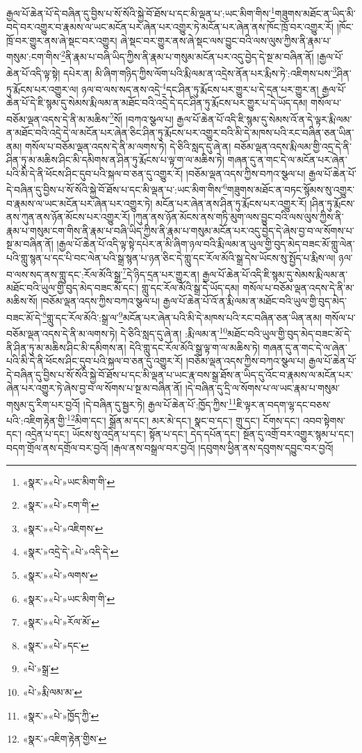 རྒྱལ་པོ་ཆེན་པོ་དེ་བཞིན་དུ་བྱིས་པ་སོ་སོའི་སྐྱེ་བོ་ཐོས་པ་དང་མི་ལྡན་པ་:ཡང་མིག་གིས་\footnote{«སྣར་»«པེ་»ཡང་མིག་གི་}གཟུགས་མཐོང་ན་ཡིད་མི་བདེ་བར་འགྱུར་བ་རྣམས་ལ་ཡང་མངོན་པར་ཞེན་པར་འགྱུར་ཏེ་མངོན་པར་ཞེན་ནས་ཁོང་ཁྲོ་བར་འགྱུར་རོ། །ཁོང་ཁྲོ་བར་གྱུར་ནས་ཞེ་སྡང་བར་འགྱུར། ཞེ་སྡང་བར་གྱུར་ནས་ཞེ་སྡང་ལས་བྱུང་བའི་ལས་ལུས་ཀྱིས་ནི་རྣམ་པ་གསུམ་:ངག་གིས་\footnote{«སྣར་»«པེ་»ངག་གི་}ནི་རྣམ་པ་བཞི་ཡིད་ཀྱིས་ནི་རྣམ་པ་གསུམ་མངོན་པར་འདུ་བྱེད་དེ་སྔ་མ་བཞིན་ནོ། །རྒྱལ་པོ་ཆེན་པོ་འདི་ལྟ་སྟེ། དཔེར་ན། མི་ཞིག་གཉིད་ཀྱིས་ལོག་པའི་རྨི་ལམ་ན་འདྲེས་ནོན་པར་རྨིས་ཏེ་:འཇིགས་པས་\footnote{«སྣར་»«པེ་»འཇིགས་}ཤིན་ཏུ་རྨོངས་པར་འགྱུར་ལ། ཉལ་བ་ལས་སད་ནས་འདྲེ་\footnote{«སྣར་»འདྲེ་དེ་«པེ་»འདི་དེ་}དང་ཤིན་ཏུ་རྨོངས་པར་གྱུར་པ་དེ་དྲན་པར་གྱུར་ན། རྒྱལ་པོ་ཆེན་པོ་དེ་ཇི་སྙམ་དུ་སེམས་རྨི་ལམ་ན་མཐོང་བའི་འདྲེ་དེ་དང་ཤིན་ཏུ་རྨོངས་པར་གྱུར་པ་དེ་ཡོད་དམ། གསོལ་པ་བཅོམ་ལྡན་འདས་དེ་ནི་མ་མཆིས་\footnote{«སྣར་»«པེ་»ལགས་}སོ། །བཀའ་སྩལ་པ། རྒྱལ་པོ་ཆེན་པོ་འདི་ཇི་སྙམ་དུ་སེམས་འོ་ན་དེ་ལྟར་རྨི་ལམ་ན་མཐོང་བའི་འདྲེ་དེ་ལ་མངོན་པར་ཞེན་ཅིང་ཤིན་ཏུ་རྨོངས་པར་འགྱུར་བའི་མི་དེ་མཁས་པའི་རང་བཞིན་ཅན་ཡིན་ནམ། གསོལ་པ་བཅོམ་ལྡན་འདས་དེ་ནི་མ་ལགས་ཏེ། དེ་ཅིའི་སླད་དུ་ཞེ་ན། བཅོམ་ལྡན་འདས་རྨི་ལམ་གྱི་འདྲ་དེ་ནི་ཤིན་ཏུ་མ་མཆིས་ཤིང་མི་དམིགས་ན་ཤིན་ཏུ་རྨོངས་པ་ལྟ་ག་ལ་མཆིས་ཏེ། གཞན་དུ་ན་གང་དེ་ལ་མངོན་པར་ཞེན་པའི་མི་དེ་ནི་ཕོངས་ཤིང་དུབ་པའི་སྐལ་བ་ཅན་དུ་འགྱུར་རོ། །བཅོམ་ལྡན་འདས་ཀྱིས་བཀའ་སྩལ་པ། རྒྱལ་པོ་ཆེན་པོ་དེ་བཞིན་དུ་བྱིས་པ་སོ་སོའི་སྐྱེ་བོ་ཐོས་པ་དང་མི་ལྡན་པ་:ཡང་མིག་གིས་\footnote{«སྣར་»«པེ་»ཡང་མིག་གི་}གཟུགས་མཐོང་ན་བཏང་སྙོམས་སུ་འགྱུར་བ་རྣམས་ལ་ཡང་མངོན་པར་ཞེན་པར་འགྱུར་ཏེ། མངོན་པར་ཞེན་ནས་ཤིན་ཏུ་རྨོངས་པར་འགྱུར་རོ། །ཤིན་ཏུ་རྨོངས་ནས་ཀུན་ནས་ཉོན་མོངས་པར་འགྱུར་རོ། །ཀུན་ནས་ཉོན་མོངས་ནས་གཏི་མུག་ལས་བྱུང་བའི་ལས་ལུས་ཀྱིས་ནི་རྣམ་པ་གསུམ་ངག་གིས་ནི་རྣམ་པ་བཞི་ཡིད་ཀྱིས་ནི་རྣམ་པ་གསུམ་མངོན་པར་འདུ་བྱེད་དེ་ཞེས་བྱ་བ་ལ་སོགས་པ་སྔ་མ་བཞིན་ནོ། །རྒྱལ་པོ་ཆེན་པོ་འདི་ལྟ་སྟེ་དཔེར་ན་མི་ཞིག་ཉལ་བའི་རྨི་ལམ་ན་ཡུལ་གྱི་བུད་མེད་བཟང་མོ་གླུ་ལེན་པའི་གླུ་སྙན་པ་དང་པི་བང་ལེན་པའི་སྒྲ་སྙན་པ་ཉན་ཅིང་དེ་གླུ་དང་རོལ་མོའི་སྒྲ་དེས་ཡོངས་སུ་སྤྱོད་པ་རྨིས་ལ། ཉལ་བ་ལས་སད་ནས་གླུ་དང་:རོལ་མོའི་སྒྲ་\footnote{«སྣར་»«པེ་»རོལ་མོ་}དེ་ཉིད་དྲན་པར་གྱུར་ན། རྒྱལ་པོ་ཆེན་པོ་འདི་ཇི་སྙམ་དུ་སེམས་རྨི་ལམ་ན་མཐོང་བའི་ཡུལ་གྱི་བུད་མེད་བཟང་མོ་དང་། གླུ་དང་རོལ་མོའི་སྒྲ་དེ་ཡོད་དམ། གསོལ་པ་བཅོམ་ལྡན་འདས་དེ་ནི་མ་མཆིས་སོ། །བཅོམ་ལྡན་འདས་ཀྱིས་བཀའ་སྩལ་པ། རྒྱལ་པོ་ཆེན་པོ་འོ་ན་རྨི་ལམ་ན་མཐོང་བའི་ཡུལ་གྱི་བུད་མེད་བཟང་མོ་དེ་\footnote{«སྣར་»«པེ་»དང་}གླུ་དང་རོལ་མོའི་:སྒྲ་ལ་\footnote{«པེ་»སྒྲ་}མངོན་པར་ཞེན་པའི་མི་དེ་མཁས་པའི་རང་བཞིན་ཅན་ཡིན་ནམ། གསོལ་པ་བཅོམ་ལྡན་འདས་དེ་ནི་མ་ལགས་ཏེ། དེ་ཅིའི་སླད་དུ་ཞེ་ན། :རྨི་ལམ་ན་\footnote{«པེ་»རྨི་ལམ་མ་}མཐོང་བའི་ཡུལ་གྱི་བུད་མེད་བཟང་མོ་དེ་ནི་ཤིན་ཏུ་མ་མཆིས་ཤིང་མི་དམིགས་ན། དེའི་གླུ་དང་རོལ་མོའི་སྒྲ་ལྟ་ག་ལ་མཆིས་ཏེ། གཞན་དུ་ན་གང་དེ་ལ་ཞེན་པའི་མི་དེ་ནི་ཕོངས་ཤིང་དུབ་པའི་སྐལ་བ་ཅན་དུ་འགྱུར་རོ། །བཅོམ་ལྡན་འདས་ཀྱིས་བཀའ་སྩལ་པ། རྒྱལ་པོ་ཆེན་པོ་དེ་བཞིན་དུ་བྱིས་པ་སོ་སོའི་སྐྱེ་བོ་ཐོས་པ་དང་མི་ལྡན་པ་ཡང་རྣ་བས་སྒྲ་ཐོས་ན་ཡིད་དུ་འོང་བ་རྣམས་ལ་མངོན་པར་ཞེན་པར་འགྱུར་ཏེ་ཞེས་བྱ་བ་ལ་སོགས་པ་སྔ་མ་བཞིན་ནོ། །དེ་བཞིན་དུ་དྲི་ལ་སོགས་པ་ལ་ཡང་རྣམ་པ་གསུམ་གསུམ་དུ་རིག་པར་བྱའོ། །དེ་བཞིན་དུ་སྦྱར་ཏེ། རྒྱལ་པོ་ཆེན་པོ་:ཁྱོད་ཀྱིས་\footnote{«སྣར་»«པེ་»ཁྱོད་ཀྱི་}ཇི་ལྟར་ན་བདག་ལྷ་དང་བཅས་པའི་:འཇིག་རྟེན་གྱི་\footnote{«སྣར་»འཇིག་རྟེན་གྱིས་}མིག་དང་། སྒྲོན་མ་དང་། མར་མེ་དང་། སྣང་བ་དང་། གྲུ་དང་། ངོགས་དང་། འབབ་སྟེགས་དང་། འདྲེན་པ་དང་། ཡོངས་སུ་འདྲེན་པ་དང་། སྟོན་པ་དང་། དེད་དཔོན་དང་། སྔོན་དུ་འགྲོ་བར་འགྱུར་སྙམ་པ་དང་། བདག་གྲོལ་ནས་དགྲོལ་བར་བྱའོ། །རྒལ་ནས་བསྒྲལ་བར་བྱའོ། །དབུགས་ཕྱིན་ནས་དབུགས་དབྱུང་བར་བྱའོ། 